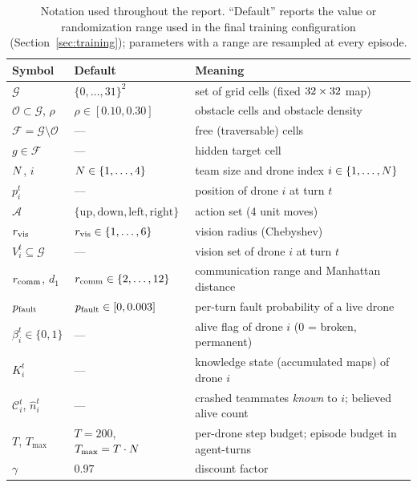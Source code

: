 \begin{table}[t]
\centering
\small
\begin{tabular}{llp{8.6cm}}
\toprule
\textbf{Symbol} & \textbf{Default} & \textbf{Meaning} \\
\midrule
$\mathcal{G}$ & $\{0,\dots,31\}^2$ & set of grid cells (fixed $32\times32$ map) \\
$\mathcal{O} \subset \mathcal{G}$, $\rho$ & $\rho \in [0.10, 0.30]$ & obstacle cells and obstacle density \\
$\mathcal{F} = \mathcal{G}\setminus\mathcal{O}$ & --- & free (traversable) cells \\
$g \in \mathcal{F}$ & --- & hidden target cell \\
$N$, $i$ & $N \in \{1,\dots,4\}$ & team size and drone index $i \in \{1,\dots,N\}$ \\
$p_i^t$ & --- & position of drone $i$ at turn $t$ \\
$\mathcal{A}$ & $\{\mathrm{up},\mathrm{down},\mathrm{left},\mathrm{right}\}$ & action set (4 unit moves) \\
$r_{\mathrm{vis}}$ & $r_{\mathrm{vis}} \in \{1,\dots,6\}$ & vision radius (Chebyshev) \\
$V_i^t \subseteq \mathcal{G}$ & --- & vision set of drone $i$ at turn $t$ \\
$r_{\mathrm{comm}}$, $d_1$ & $r_{\mathrm{comm}} \in \{2,\dots,12\}$ & communication range and Manhattan distance \\
$p_{\mathrm{fault}}$ & $p_{\mathrm{fault}} \in [0, 0.003]$ & per-turn fault probability of a live drone \\
$\beta_i^t \in \{0,1\}$ & --- & alive flag of drone $i$ ($0$ = broken, permanent) \\
$K_i^t$ & --- & knowledge state (accumulated maps) of drone $i$ \\
$\mathcal{C}_i^t$, $\hat{n}_i^t$ & --- & crashed teammates \emph{known} to $i$; believed alive count \\
$T$, $T_{\max}$ & $T = 200$, $T_{\max} = T\cdot N$ & per-drone step budget; episode budget in agent-turns \\
$\gamma$ & $0.97$ & discount factor \\
\bottomrule
\end{tabular}
\caption{Notation used throughout the report. ``Default'' reports the value
or randomization range used in the final training configuration
(Section~\ref{sec:training}); parameters with a range are resampled at every
episode.}
\label{tab:notation}
\end{table}

